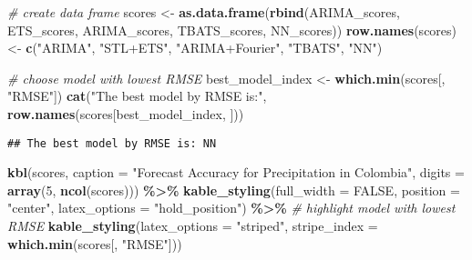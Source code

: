\documentclass[
]{article}
\newenvironment{Shaded}{\begin{snugshade}}{\end{snugshade}}
\newcommand{\AttributeTok}[1]{\textcolor[rgb]{0.13,0.29,0.53}{#1}}
\newcommand{\CommentTok}[1]{\textcolor[rgb]{0.56,0.35,0.01}{\textit{#1}}}
\newcommand{\ConstantTok}[1]{\textcolor[rgb]{0.56,0.35,0.01}{#1}}
\newcommand{\DecValTok}[1]{\textcolor[rgb]{0.00,0.00,0.81}{#1}}
\newcommand{\FunctionTok}[1]{\textcolor[rgb]{0.13,0.29,0.53}{\textbf{#1}}}
\newcommand{\NormalTok}[1]{#1}
\newcommand{\OtherTok}[1]{\textcolor[rgb]{0.56,0.35,0.01}{#1}}
\newcommand{\SpecialCharTok}[1]{\textcolor[rgb]{0.81,0.36,0.00}{\textbf{#1}}}
\newcommand{\StringTok}[1]{\textcolor[rgb]{0.31,0.60,0.02}{#1}}
\begin{document}
\begin{Shaded}
\begin{Highlighting}[]
\CommentTok{\# create data frame}
\NormalTok{scores }\OtherTok{\textless{}{-}} \FunctionTok{as.data.frame}\NormalTok{(}\FunctionTok{rbind}\NormalTok{(ARIMA\_scores, ETS\_scores, ARIMA\_scores,}
\NormalTok{    TBATS\_scores, NN\_scores))}
\FunctionTok{row.names}\NormalTok{(scores) }\OtherTok{\textless{}{-}} \FunctionTok{c}\NormalTok{(}\StringTok{"ARIMA"}\NormalTok{, }\StringTok{"STL+ETS"}\NormalTok{, }\StringTok{"ARIMA+Fourier"}\NormalTok{, }\StringTok{"TBATS"}\NormalTok{,}
    \StringTok{"NN"}\NormalTok{)}

\CommentTok{\# choose model with lowest RMSE}
\NormalTok{best\_model\_index }\OtherTok{\textless{}{-}} \FunctionTok{which.min}\NormalTok{(scores[, }\StringTok{"RMSE"}\NormalTok{])}
\FunctionTok{cat}\NormalTok{(}\StringTok{"The best model by RMSE is:"}\NormalTok{, }\FunctionTok{row.names}\NormalTok{(scores[best\_model\_index,}
\NormalTok{    ]))}
\end{Highlighting}
\end{Shaded}

\begin{verbatim}
## The best model by RMSE is: NN
\end{verbatim}

\begin{Shaded}
\begin{Highlighting}[]
\FunctionTok{kbl}\NormalTok{(scores, }\AttributeTok{caption =} \StringTok{"Forecast Accuracy for Precipitation in Colombia"}\NormalTok{,}
    \AttributeTok{digits =} \FunctionTok{array}\NormalTok{(}\DecValTok{5}\NormalTok{, }\FunctionTok{ncol}\NormalTok{(scores))) }\SpecialCharTok{\%\textgreater{}\%}
    \FunctionTok{kable\_styling}\NormalTok{(}\AttributeTok{full\_width =} \ConstantTok{FALSE}\NormalTok{, }\AttributeTok{position =} \StringTok{"center"}\NormalTok{, }\AttributeTok{latex\_options =} \StringTok{"hold\_position"}\NormalTok{) }\SpecialCharTok{\%\textgreater{}\%}
    \CommentTok{\# highlight model with lowest RMSE}
\FunctionTok{kable\_styling}\NormalTok{(}\AttributeTok{latex\_options =} \StringTok{"striped"}\NormalTok{, }\AttributeTok{stripe\_index =} \FunctionTok{which.min}\NormalTok{(scores[,}
    \StringTok{"RMSE"}\NormalTok{]))}
\end{Highlighting}
\end{Shaded}
\end{document}
